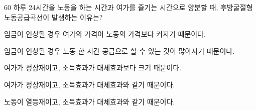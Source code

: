 \begin{question}{60}
하루 24시간을 노동을 하는 시간과 여가를 즐기는 시간으로 양분할 때, 후방굴절형 노동공급곡선이 발생하는 이유는?
\begin{choices}
  \item 임금이 인상될 경우 여가의 가격이 노동의 가격보다 커지기 때문이다.
  \item 임금이 인상될 경우 노동 한 시간 공급으로 할 수 있는 것이 많아지기 때문이다.
  \item 여가가 정상재이고, 소득효과가 대체효과보다 크기 때문이다.
  \item 여가가 정상재이고, 소득효과가 대체효과와 같기 때문이다.
  \item 노동이 열등재이고, 소득효과가 대체효과와 같기 때문이다.
\end{choices}
\end{question}
